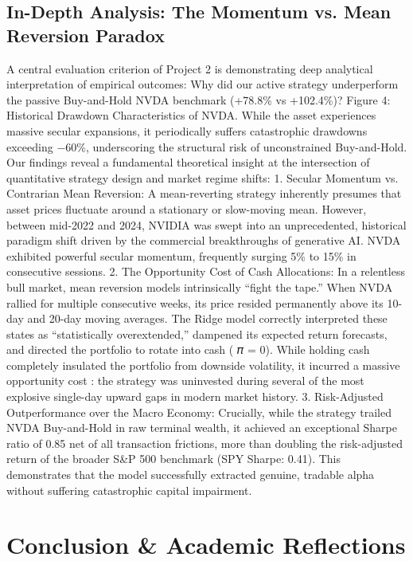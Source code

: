 \documentclass[12pt, a4paper]{article}
\begin{document}
{\subsection{In-Depth Analysis: The Momentum vs. Mean Reversion Paradox}
A central evaluation criterion of Project 2 is demonstrating deep analytical interpretation of empirical 
outcomes: Why did our active strategy underperform the passive Buy-and-Hold NVDA benchmark 
(+78.8\% vs +102.4\%)?
Figure 4: Historical Drawdown Characteristics of NVDA. While the asset experiences massive secular 
expansions, it periodically suffers catastrophic drawdowns exceeding −60\%, underscoring the structural 
risk of unconstrained Buy-and-Hold.
Our findings reveal a fundamental theoretical insight at the intersection of quantitative strategy design 
and market regime shifts:
1. Secular Momentum vs. Contrarian Mean Reversion:  A mean-reverting strategy inherently 
presumes that asset prices fluctuate around a stationary or slow-moving mean. However, between 
mid-2022 and 2024, NVIDIA was swept into an unprecedented, historical paradigm shift driven by 
the commercial breakthroughs of generative AI. NVDA exhibited powerful secular momentum, 
frequently surging 5\% to 15\% in consecutive sessions.
2. The Opportunity Cost of Cash Allocations:  In a relentless bull market, mean reversion models 
intrinsically ``fight the tape.'' When NVDA rallied for multiple consecutive weeks, its price resided 
permanently above its 10-day and 20-day moving averages. The Ridge model correctly interpreted 
these states as ``statistically overextended,'' dampened its expected return forecasts, and directed the 
portfolio to rotate into cash ( 𝜋 = 0). While holding cash completely insulated the portfolio from 
downside volatility, it incurred a massive opportunity cost : the strategy was uninvested during 
several of the most explosive single-day upward gaps in modern market history.
3. Risk-Adjusted Outperformance over the Macro Economy:  Crucially, while the strategy trailed 
NVDA Buy-and-Hold in raw terminal wealth, it achieved an exceptional Sharpe ratio of 0.85 net of all 
transaction frictions, more than doubling the risk-adjusted return of the broader S\&P 500 benchmark 
(SPY Sharpe: 0.41). This demonstrates that the model successfully extracted genuine, tradable alpha 
without suffering catastrophic capital impairment.

\section{Conclusion \& Academic Reflections}
}
\end{document}
